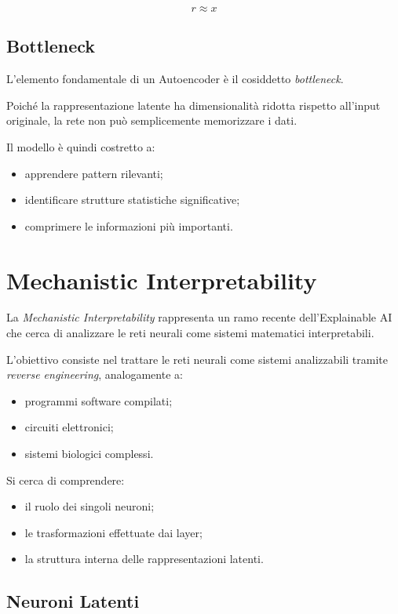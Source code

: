 \[
r \approx x
\]

\subsection{Bottleneck}

L'elemento fondamentale di un Autoencoder è il cosiddetto \textit{bottleneck}.

Poiché la rappresentazione latente ha dimensionalità ridotta rispetto all'input originale, la rete non può semplicemente memorizzare i dati.

Il modello è quindi costretto a:

\begin{itemize}
    \item apprendere pattern rilevanti;
    \item identificare strutture statistiche significative;
    \item comprimere le informazioni più importanti.
\end{itemize}

\section{Mechanistic Interpretability}

La \textit{Mechanistic Interpretability} rappresenta un ramo recente dell'Explainable AI che cerca di analizzare le reti neurali come sistemi matematici interpretabili.

L'obiettivo consiste nel trattare le reti neurali come sistemi analizzabili tramite \textit{reverse engineering}, analogamente a:

\begin{itemize}
    \item programmi software compilati;
    \item circuiti elettronici;
    \item sistemi biologici complessi.
\end{itemize}

Si cerca di comprendere:

\begin{itemize}
    \item il ruolo dei singoli neuroni;
    \item le trasformazioni effettuate dai layer;
    \item la struttura interna delle rappresentazioni latenti.
\end{itemize}

\subsection{Neuroni Latenti}

